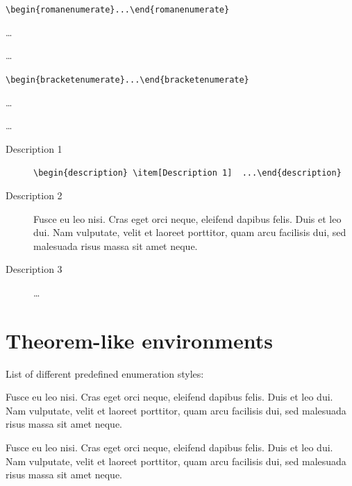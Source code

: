 \documentclass[a4paper,UKenglish,cleveref, autoref]{lipics-v2019}
\begin{document}
\begin{romanenumerate}
\item \verb|\begin{romanenumerate}...\end{romanenumerate}|
\item \dots
\item \dots
\end{romanenumerate}

\begin{bracketenumerate}
\item \verb|\begin{bracketenumerate}...\end{bracketenumerate}|
\item \dots
\item \dots
\end{bracketenumerate}

\begin{description}
\item[Description 1] \verb|\begin{description} \item[Description 1]  ...\end{description}|
\item[Description 2] Fusce eu leo nisi. Cras eget orci neque, eleifend dapibus felis. Duis et leo dui. Nam vulputate, velit et laoreet porttitor, quam arcu facilisis dui, sed malesuada risus massa sit amet neque.
\item[Description 3]  \dots
\end{description}

\section{Theorem-like environments}\label{sec:theorem-environments}

List of different predefined enumeration styles:

\begin{theorem}\label{testenv-theorem}
Fusce eu leo nisi. Cras eget orci neque, eleifend dapibus felis. Duis et leo dui. Nam vulputate, velit et laoreet porttitor, quam arcu facilisis dui, sed malesuada risus massa sit amet neque.
\end{theorem}

\begin{lemma}\label{testenv-lemma}
Fusce eu leo nisi. Cras eget orci neque, eleifend dapibus felis. Duis et leo dui. Nam vulputate, velit et laoreet porttitor, quam arcu facilisis dui, sed malesuada risus massa sit amet neque.
\end{lemma}
\end{document}
